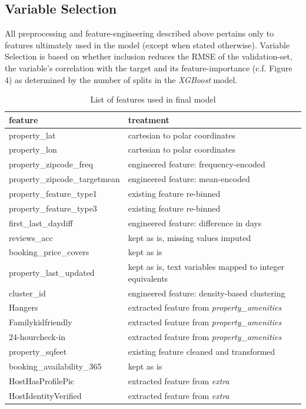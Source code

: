 \documentclass[11pt, oneside]{article}   	%
\begin{document}
\subsection{Variable Selection}
All preprocessing and feature-engineering described above pertains only to features ultimately used in the model (except when  stated otherwise). Variable Selection is based on whether inclusion reduces the RMSE of the validation-set, the variable's  correlation with the target and its feature-importance (c.f. Figure 4) as determined by the number of splits in the \textit{XGBoost} model.
\begin{table}
\begin{center}
\begin{tabular}{l | l }
feature&treatment\\
\hline
property\_lat&cartesian to polar coordinates\\
property\_lon&cartesian to polar coordinates\\
property\_zipcode\_freq&engineered feature: frequency-encoded\\
property\_zipcode\_targetmean&engineered feature: mean-encoded\\
property\_feature\_type1&existing feature re-binned\\
property\_feature\_type3&existing feature re-binned\\
first\_last\_daydiff&engineered feature: difference in days\\
reviews\_acc&kept as is, missing values imputed\\
booking\_price\_covers&kept as is\\
property\_last\_updated&kept as is, text variables mapped to integer equivalents\\
cluster\_id&engineered feature: density-based clustering\\
Hangers&extracted feature from \textit{property\_amenities}\\
Familykidfriendly&extracted feature from \textit{property\_amenities}\\
24-hourcheck-in&extracted feature from \textit{property\_amenities}\\
property\_sqfeet&existing feature cleaned and transformed\\
booking\_availability\_365&kept as is\\
HostHasProfilePic&extracted feature from \textit{extra}\\
HostIdentityVerified&extracted feature from \textit{extra}
\end{tabular}
\caption{\label{demo-table}List of features used in final model}
\end{center}
\end{table}
\end{document}
